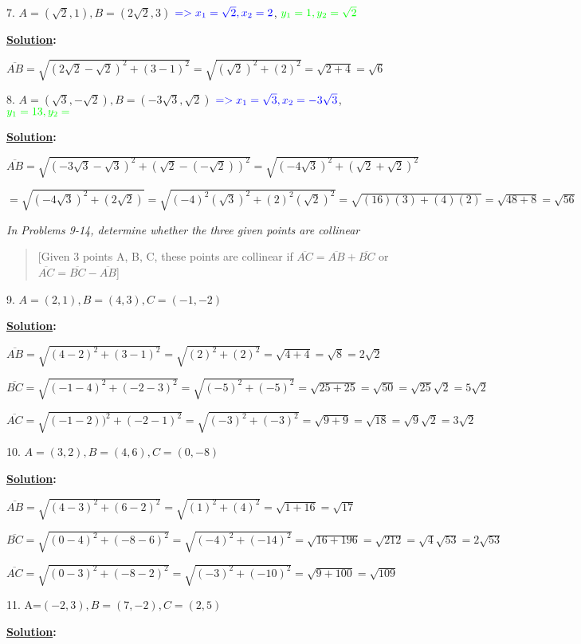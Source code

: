 \documentclass[10pt,letterpaper]{article}
\begin{document}
7. $A=(\sqrt{2}, 1), B=(2\sqrt{2}, 3)$ $\color{blue} => x_1=\sqrt{2}, x_2=2$, $\color{green}y_1=1, y_2=\sqrt{2} $

\textbf{\underline {Solution}:}

$\overline{AB}=\sqrt{(2\sqrt{2}-\sqrt{2})^2+(3-1)^2}=\sqrt{(\sqrt{2})^2+(2)^2}=\sqrt{2+4}=\sqrt{6}$

8. $A=(\sqrt{3}, -\sqrt{2}), B=(-3\sqrt{3}, \sqrt{2})$ $\color{blue} => x_1=\sqrt{3}, x_2=-3\sqrt{3}$, $\color{green}y_1=13, y_2= $

\textbf{\underline {Solution}:}

$\overline{AB}=\sqrt{(-3\sqrt{3}-\sqrt{3})^2+(\sqrt{2}-(-\sqrt{2}))^2}=\sqrt{(-4\sqrt{3})^2+(\sqrt{2}+\sqrt{2})^2}$

$=\sqrt{(-4\sqrt{3})^2+(2\sqrt{2})}=\sqrt{(-4)^2(\sqrt{3})^2+(2)^2(\sqrt{2})^2}=\sqrt{(16)(3)+(4)(2)}=\sqrt{48+8}=\sqrt{56}$

\textit{In Problems 9-14, determine whether the three given points are collinear}

\begin{quote}
{}[Given 3 points A, B, C, these points are collinear if $\overline{AC}=\overline{AB}+\overline{BC}$ or $\overline{AC}=\overline{BC}-\overline{AB}$]
\end{quote}

9. $A=(2, 1), B=(4, 3), C=(-1, -2)$

\textbf{\underline {Solution}:}

$\overline{AB} =\sqrt{(4-2)^2+(3-1)^2}=\sqrt{(2)^2+(2)^2}=\sqrt{4+4}=\sqrt{8}=2\sqrt{2}$

$\overline{BC} =\sqrt{(-1-4)^2+(-2-3)^2}=\sqrt{(-5)^2+(-5)^2}=\sqrt{25+25}=\sqrt{50}=\sqrt{25}\sqrt{2}=5\sqrt{2}$

$\overline{AC} =\sqrt{(-1-2))^2+(-2-1)^2}=\sqrt{(-3)^2+(-3)^2}=\sqrt{9+9}=\sqrt{18}=\sqrt{9}\sqrt{2}=3\sqrt{2}$

10. $A=(3, 2), B=(4, 6), C=(0, -8)$

\textbf{\underline {Solution}:}

$\overline{AB} =\sqrt{(4-3)^2+(6-2)^2}=\sqrt{(1)^2+(4)^2}=\sqrt{1+16}=\sqrt{17}$

$\overline{BC} =\sqrt{(0-4)^2+(-8-6)^2}=\sqrt{(-4)^2+(-14)^2}=\sqrt{16+196}=\sqrt{212}=\sqrt{4}\sqrt{53}=2\sqrt{53}$

$\overline{AC} =\sqrt{(0-3)^2+(-8-2)^2}=\sqrt{(-3)^2+(-10)^2}=\sqrt{9+100}=\sqrt{109}$


11. A=$(-2, 3), B=(7, -2), C=(2, 5)$

\textbf{\underline {Solution}:}
\end{document}
